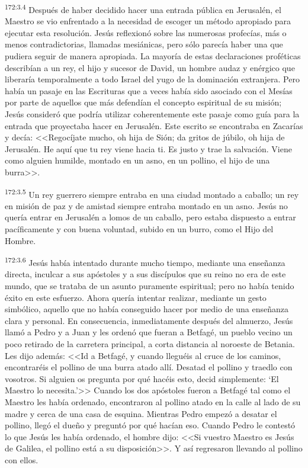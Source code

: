 \par 
\textsuperscript{172:3.4} Después de haber decidido hacer una entrada pública en Jerusalén, el Maestro se vio enfrentado a la necesidad de escoger un método apropiado para ejecutar esta resolución. Jesús reflexionó sobre las numerosas profecías, más o menos contradictorias, llamadas mesiánicas, pero sólo parecía haber una que pudiera seguir de manera apropiada. La mayoría de estas declaraciones proféticas describían a un rey, el hijo y sucesor de David, un hombre audaz y enérgico que liberaría temporalmente a todo Israel del yugo de la dominación extranjera. Pero había un pasaje en las Escrituras que a veces había sido asociado con el Mesías por parte de aquellos que más defendían el concepto espiritual de su misión; Jesús consideró que podría utilizar coherentemente este pasaje como guía para la entrada que proyectaba hacer en Jerusalén. Este escrito se encontraba en Zacarías y decía: <<Regocíjate mucho, oh hija de Sión; da gritos de júbilo, oh hija de Jerusalén. He aquí que tu rey viene hacia ti. Es justo y trae la salvación. Viene como alguien humilde, montado en un asno, en un pollino, el hijo de una burra>>.

\par 
\textsuperscript{172:3.5} Un rey guerrero siempre entraba en una ciudad montado a caballo; un rey en misión de paz y de amistad siempre entraba montado en un asno. Jesús no quería entrar en Jerusalén a lomos de un caballo, pero estaba dispuesto a entrar pacíficamente y con buena voluntad, subido en un burro, como el Hijo del Hombre.

\par 
\textsuperscript{172:3.6} Jesús había intentado durante mucho tiempo, mediante una enseñanza directa, inculcar a sus apóstoles y a sus discípulos que su reino no era de este mundo, que se trataba de un asunto puramente espiritual; pero no había tenido éxito en este esfuerzo. Ahora quería intentar realizar, mediante un gesto simbólico, aquello que no había conseguido hacer por medio de una enseñanza clara y personal. En consecuencia, inmediatamente después del almuerzo, Jesús llamó a Pedro y a Juan y les ordenó que fueran a Betfagé, un pueblo vecino un poco retirado de la carretera principal, a corta distancia al noroeste de Betania. Les dijo además: <<Id a Betfagé, y cuando lleguéis al cruce de los caminos, encontraréis el pollino de una burra atado allí. Desatad el pollino y traedlo con vosotros. Si alguien os pregunta por qué hacéis esto, decid simplemente: `El Maestro lo necesita.'>> Cuando los dos apóstoles fueron a Betfagé tal como el Maestro les había ordenado, encontraron al pollino atado en la calle al lado de su madre y cerca de una casa de esquina. Mientras Pedro empezó a desatar el pollino, llegó el dueño y preguntó por qué hacían eso. Cuando Pedro le contestó lo que Jesús les había ordenado, el hombre dijo: <<Si vuestro Maestro es Jesús de Galilea, el pollino está a su disposición>>. Y así regresaron llevando al pollino con ellos.

